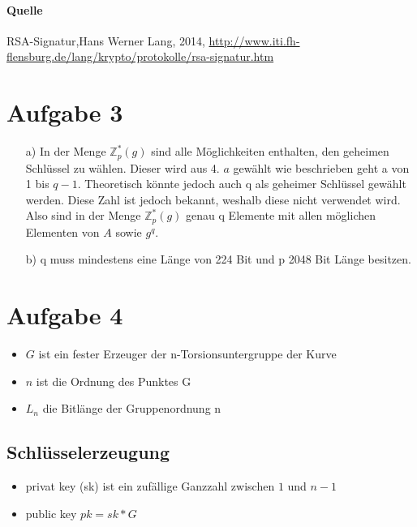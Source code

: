 \documentclass{scrartcl}
\begin{document}
\paragraph*{Quelle}
RSA-Signatur,Hans Werner Lang, 2014, \url{http://www.iti.fh-flensburg.de/lang/krypto/protokolle/rsa-signatur.htm}

\section*{Aufgabe 3}

\begin{itemize}
\item[a)] In der Menge $\mathbb{Z}^*_p (g)$ sind alle Möglichkeiten enthalten, den geheimen Schlüssel zu wählen. Dieser wird aus 4. $a$ gewählt wie beschrieben geht a von 1 bis $q-1$. Theoretisch könnte jedoch auch q als geheimer Schlüssel gewählt werden. Diese Zahl ist jedoch bekannt, weshalb diese nicht verwendet wird. Also sind in der Menge $\mathbb{Z}^*_p (g)$ genau q Elemente mit allen möglichen Elementen von $A$ sowie $g^q$.
\item[b)] q muss mindestens eine Länge von 224 Bit und p 2048 Bit Länge besitzen.
\end{itemize}

\section*{Aufgabe 4}
\begin{itemize}
\item $G$ ist ein fester Erzeuger der n-Torsionsuntergruppe der Kurve
\item $n$ ist die Ordnung des Punktes G
\item $L_n$ die Bitlänge der Gruppenordnung n
\end{itemize}

\subsection*{Schlüsselerzeugung}
\begin{itemize}
\item privat key (sk) ist ein zufällige Ganzzahl zwischen $1$ und $n-1$
\item public key $pk = sk * G$
\end{itemize}
\end{document}
